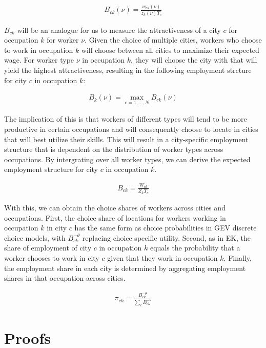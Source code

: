 \documentclass[10pt]{article}
\begin{document}
\begin{align}
    B_{ck}(\nu) = \frac{w_{ck}(\nu)}{z_{k}(\nu)T_{c}}
\end{align}

$B_{ck}$ will be an analogue for us to measure the attractiveness of a city $c$ for occupation $k$ for worker $\nu$. Given the choice of multiple cities, workers who choose to work in occupation $k$ will choose between all cities to maximize their expected wage. For worker type $\nu$ in occupation $k$, they will choose the city with that will yield the highest attractiveness, resulting in the following employment strcture for city $c$ in occupation $k$:

\begin{align}
    B_k (\nu) = \max_{c = 1, \dots, N} B_{ck}(\nu)
\end{align}

The implication of this is that workers of different types will tend to be more productive in certain occupations and will consequently choose to locate in cities that will best utilize their skills. This will result in a city-specific employment structure that is dependent on the distribution of worker types across occupations. By intergrating over all worker types, we can derive the expected employment structure for city $c$ in occupation $k$.

\begin{align}
    B_{ck} = \frac{W_{ck}}{Z_k T_c}
\end{align}

With this, we can obtain the choice shares of workers across cities and occupations. First, the choice share of locations for workers working in occupation $k$ in city $c$ has the same form as choice probabilities in GEV discrete choice models, with $B_{ck}^{-\theta}$ replacing choice specific utility. Second, as in EK, the share of employment of city $c$ in occupation $k$ equals the probability that a worker chooses to work in city $c$ given that they work in occupation $k$. Finally, the employment share in each city is determined by aggregating employment shares in that occupation across cities.

\begin{align}
    \pi_{ck} = \frac{B_{ck}^{- \theta}}{\sum_{c}^{} B_{ck}^{- \theta}}
\end{align}

\newpage

\section{Proofs}
\end{document}
